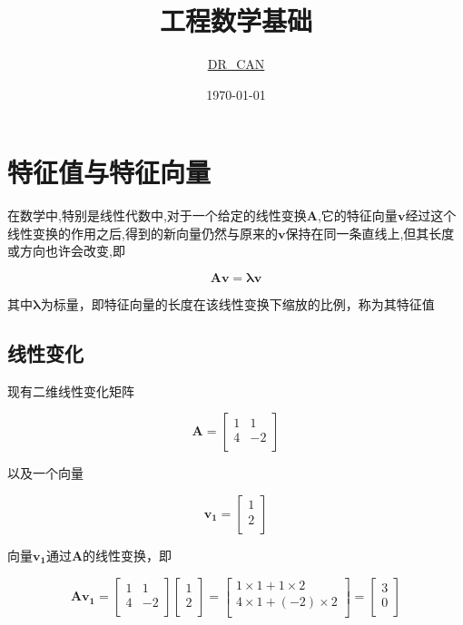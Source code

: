 \documentclass[12pt, a4paper, oneside]{ctexbook}
\title{{\Huge{\textbf{工程数学基础}}}}
\author{\href{https://space.bilibili.com/230105574}{DR\_CAN}}
\date{\today}
\begin{document}
\maketitle



\newpage
{}
\setcounter{page}{1}
\tableofcontents
\newpage
\setcounter{page}{1}


\chapter{特征值与特征向量}

在数学中,特别是线性代数中,对于一个给定的线性变换$\bm{A}$,它的特征向量$\bm{v}$经过这个线性变换的作用之后,得到的新向量仍然与原来的$\bm{v}$保持在同一条直线上,但其长度或方向也许会改变,即

$$ \bm{Av}=\bm {\lambda v} $$


其中$\bm{\lambda}$为标量，即特征向量的长度在该线性变换下缩放的比例，称为其特征值


\section{线性变化}

 现有二维线性变化矩阵

$$
\bm{A}=
 \left[
    \begin{matrix}
        1 & 1 \\
        4 & -2 \\
    \end{matrix}
 \right]
 $$

以及一个向量

$$\bm{v_1}=
\left[
    \begin{matrix}
        1 \\ 2 \\
    \end{matrix}
\right]
$$

向量$\bm{v_1}$通过$\bm{A}$的线性变换，即

$$
\bm{A v_1}=
\left[
    \begin{matrix}
        1 & 1 \\
        4 & -2 \\
    \end{matrix}
\right]
\left[
    \begin{matrix}
        1 \\ 2 \\
    \end{matrix}
\right]=
\left[
    \begin{matrix}
        1 \times 1 + 1 \times 2 \\
        4 \times 1 + (-2) \times 2 \\
    \end{matrix}
\right]=
\left[
    \begin{matrix}
        3 \\ 0 \\
    \end{matrix}
\right]
$$
\end{document}
